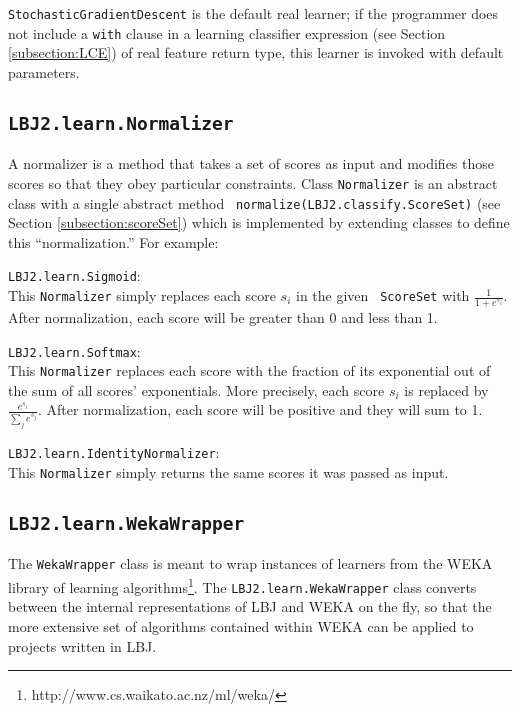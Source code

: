 {\tt StochasticGradientDescent} is the default real learner; if the programmer
does not include a {\tt with} clause in a learning classifier expression (see
Section \ref{subsection:LCE}) of real feature return type, this learner is
invoked with default parameters.

\subsection{{\tt LBJ2.learn.Normalizer}}
A normalizer is a method that takes a set of scores as input and modifies
those scores so that they obey particular constraints.  Class {\tt Normalizer}
is an abstract class with a single abstract method {\tt
normalize(LBJ2.classify.ScoreSet)} (see Section \ref{subsection:scoreSet})
which is implemented by extending classes to define this ``normalization.''
For example:

\begin{list}{}{}
\item[{\tt LBJ2.learn.Sigmoid}:] ~\\
This {\tt Normalizer} simply replaces each score $s_i$ in the given {\tt
ScoreSet} with $\frac{1}{1 + e^{s_i}}$.  After normalization, each score will
be greater than 0 and less than 1.

\item[{\tt LBJ2.learn.Softmax}:] ~\\
This {\tt Normalizer} replaces each score with the fraction of its exponential
out of the sum of all scores' exponentials.  More precisely, each score $s_i$
is replaced by $\frac{e^{s_i}}{\sum_j e^{s_j}}$.  After normalization, each
score will be positive and they will sum to 1.

\item[{\tt LBJ2.learn.IdentityNormalizer}:] ~\\
This {\tt Normalizer} simply returns the same scores it was passed as input.
\end{list}

\subsection{{\tt LBJ2.learn.WekaWrapper}}
The {\tt WekaWrapper} class is meant to wrap instances of learners from the
WEKA library of learning
algorithms\footnote{http://www.cs.waikato.ac.nz/ml/weka/}.  The
{\tt LBJ2.learn.WekaWrapper} class converts between the internal
representations of LBJ and WEKA on the fly, so that the more extensive set of
algorithms contained within WEKA can be applied to projects written in LBJ.\\

